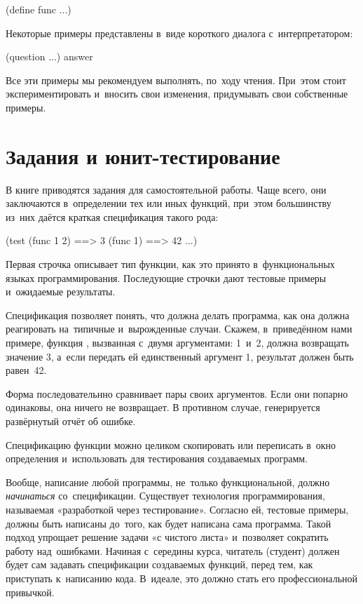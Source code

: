 \begin{Definition}
(define func
 ...)
\end{Definition}

Некоторые примеры представлены в~виде короткого диалога с~интерпретатором:

\REPL
  {(question ...)}
  {answer}

Все эти примеры мы рекомендуем выполнять, по~ходу чтения. При~этом стоит экспериментировать и~вносить свои изменения, придумывать свои собственные примеры.

\section{Задания и юнит-тестирование}%
В книге приводятся задания для самостоятельной работы. Чаще всего, они заключаются в~определении тех или иных функций, при~этом большинству из~них даётся краткая спецификация такого рода:

\begin{Specification}
(test 
  (func 1 2)  ==> 3
  (func 1)    ==> 42
  ...)
\end{Specification}

\noindent Первая строчка описывает тип функции, как это принято в~функциональных языках программирования. Последующие строчки дают тестовые примеры и~ожидаемые результаты. 

Спецификация позволяет понять, что должна делать программа, как она должна реагировать на~типичные и~вырожденные случаи. Скажем, в~приведённом нами примере, функция , вызванная с~двумя аргументами: 1~и~2, должна возвращать значение 3, а~если передать ей единственный аргумент 1, результат должен быть равен~42.

Форма   последовательнно сравнивает пары своих аргументов. Если они попарно одинаковы, она ничего не возвращает. В противном случае, генерируется развёрнутый отчёт об ошибке.

Спецификацию функции можно целиком скопировать или переписать в~окно определения  и~использовать для тестирования создаваемых программ.

Вообще, написание любой программы, не~только функциональной, должно \emph{начинаться} со~спецификации. Существует технология программирования, называемая «разработкой через тестирование». Согласно ей, тестовые примеры, должны быть написаны до~того, как будет написана сама программа. Такой подход упрощает решение задачи «с чистого листа» и~позволяет сократить работу над~ошибками. Начиная с~середины курса, читатель (студент) должен будет сам задавать спецификации создаваемых функций, перед тем, как приступать к~написанию кода. В~идеале, это должно стать его профессиональной привычкой.

